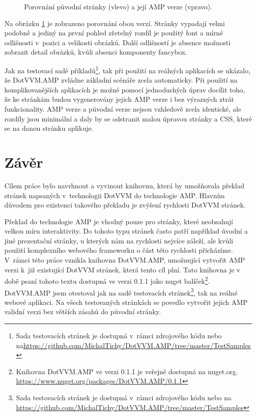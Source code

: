 \begin{figure}[!h]
	\caption{Porovnání původní stránky (vlevo) a její AMP verze (vpravo).}
	\label{originalVSamp}
\end{figure}

Na obrázku \ref{originalVSamp} je zobrazeno porovnání obou verzí. Stránky vypadají velmi podobně a jediný na první pohled zřetelný rozdíl je použitý font a mírné odlišnosti v~pozici a velikosti obrázků. Další odlišností je absence možnosti zobrazit detail obrázků, kvůli absenci komponenty fancybox.

Jak na testovací sadě příkladů\footnote{ Sada testovacích stránek je dostupná v~rámci zdrojového kódu nebo na\newline \url{https://github.com/MichalTichy/DotVVM.AMP/tree/master/TestSamples}}, tak při použití na reálných aplikacích se ukázalo, že DotVVM.AMP zvládne základní scénáře zcela automaticky. Při použití na komplikovanějších aplikacích je možné pomocí jednoduchých úprav docílit toho, že ke stránkám budou vygenerovány jejich AMP verze i bez výrazných ztrát funkcionality. AMP verze a původní verze nejsou vzhledově zcela identické, ale rozdíly jsou minimální a daly by se odstranit malou úpravou stránky a CSS, které se na danou stránku aplikuje.

\chapter{Závěr}
\setlength{\baselineskip}{0.92\baselineskip}
Cílem práce bylo navrhnout a vyvinout knihovnu, která by umožňovala překlad stránek napsaných v~technologii DotVVM do technologie AMP. Hlavním důvodem pro existenci takového překladu je zvýšení rychlosti DotVVM stránek.

Překlad do technologie AMP je vhodný pouze pro stránky, které neobsahují velkou míru interaktivity. Do tohoto typu stránek často patří například úvodní a jiné prezentační stránky, u kterých nám na rychlosti nejvíce záleží, ale kvůli použití komplexního webového frameworku o část této rychlosti přicházíme. V~rámci této práce vznikla knihovna DotVVM.AMP, umožnující vytvořit AMP verzi k~již existující DotVVM stránek, která tento cíl plní. Tato knihovna je v době psaní tohoto textu dostupná ve verzi 0.1.1 jako nuget balíček\footnote{Knihovna DotVVM.AMP ve verzi 0.1.1 je veřejně dostupná na nuget.org.
\url{https://www.nuget.org/packages/DotVVM.AMP/0.1.1}}. DotVVM.AMP jsem otestoval jak na sadě testovacích stránek\footnote{ Sada testovacích stránek je dostupná v~rámci zdrojového kódu nebo na \url{https://github.com/MichalTichy/DotVVM.AMP/tree/master/TestSamples}}, tak na reálné webové aplikaci. Na všech testovaných stránkách se povedlo vytvořit jejich AMP validní verzi bez větších zásahů do původní stránky.

